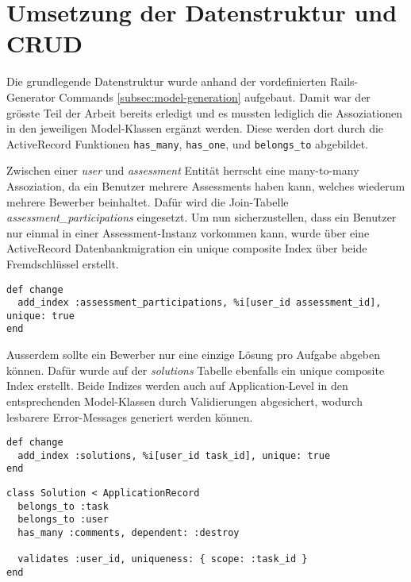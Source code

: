 \section{Umsetzung der Datenstruktur und CRUD}

Die grundlegende Datenstruktur wurde anhand der vordefinierten Rails-Generator Commands \ref{subsec:model-generation} aufgebaut.
Damit war der grösste Teil der Arbeit bereits erledigt und es mussten lediglich die Assoziationen in den jeweiligen Model-Klassen ergänzt werden.
Diese werden dort durch die ActiveRecord Funktionen \texttt{has_many}, \texttt{has_one}, und \texttt{belongs_to} abgebildet.

Zwischen einer \emph{user} und \emph{assessment} Entität herrscht eine many-to-many Assoziation, da ein Benutzer
mehrere Assessments haben kann, welches wiederum mehrere Bewerber beinhaltet. Dafür wird die Join-Tabelle \emph{assessment\_participations}
eingesetzt. Um nun sicherzustellen, dass ein Benutzer nur einmal in einer Assessment-Instanz vorkommen kann, wurde über eine ActiveRecord Datenbankmigration ein 
unique composite Index über beide Fremdschlüssel erstellt.

\begin{codebox}
\begin{verbatim}
def change
  add_index :assessment_participations, %i[user_id assessment_id], unique: true
end

\end{verbatim}
\end{codebox}

Ausserdem sollte ein Bewerber nur eine einzige Lösung pro Aufgabe abgeben können. Dafür wurde auf der \emph{solutions}
Tabelle ebenfalls ein unique composite Index erstellt. Beide Indizes werden auch auf Application-Level in den entsprechenden Model-Klassen
durch Validierungen abgesichert, wodurch lesbarere Error-Messages generiert werden können.

\begin{codebox}
\begin{verbatim}
def change
  add_index :solutions, %i[user_id task_id], unique: true
end
\end{verbatim}
\end{codebox}

\begin{codebox}
\begin{verbatim}
class Solution < ApplicationRecord
  belongs_to :task
  belongs_to :user
  has_many :comments, dependent: :destroy

  validates :user_id, uniqueness: { scope: :task_id }
end
\end{verbatim}
\end{codebox}

